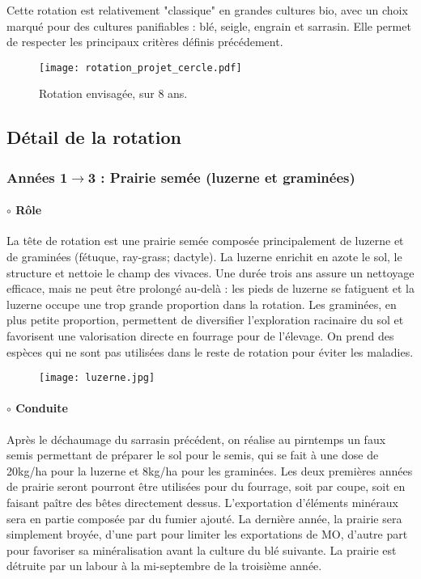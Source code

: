 \documentclass{book}
\begin{document}
Cette rotation est relativement "classique" en grandes cultures bio, avec un choix marqué pour des cultures panifiables : blé, seigle, engrain et sarrasin. Elle permet de respecter les principaux critères définis précédement. 

\begin{figure}[h!]
\begin{center}
	\texttt{[image: rotation\_projet\_cercle.pdf]}
	\caption{Rotation envisagée, sur 8 ans.}
	\label{fig:rot_cercle}
\end{center}
\end{figure}

\subsection{Détail de la rotation}
\label{part:rot_detail}

\subsubsection{Années 1$\rightarrow$3 : Prairie semée (luzerne et graminées)}

\paragraph{$\circ$ Rôle} La tête de rotation est une prairie semée composée principalement de luzerne et de graminées (fétuque, ray-grass; dactyle). La luzerne enrichit en azote le sol, le structure et nettoie le champ des vivaces. Une durée trois ans assure un nettoyage efficace, mais ne peut être prolongé au-delà : les pieds de luzerne se fatiguent et la luzerne occupe une trop grande proportion dans la rotation. Les graminées, en plus petite proportion, permettent de diversifier l'exploration racinaire du sol et favorisent une valorisation directe en fourrage pour de l'élevage. On prend des espèces qui ne sont pas utilisées dans le reste de rotation pour éviter les maladies.

\begin{figure}[h!]
\begin{center}
	\texttt{[image: luzerne.jpg]}
\end{center}
\end{figure}

\paragraph{$\circ$ Conduite} Après le déchaumage du sarrasin précédent, on réalise au pirntemps un faux semis permettant de préparer le sol pour le semis, qui se fait à une dose de 20kg/ha pour la luzerne et 8kg/ha pour les graminées. Les deux premières années de prairie seront pourront être utilisées pour du fourrage, soit par coupe, soit en faisant paître des bêtes directement dessus. L'exportation d'éléments minéraux sera en partie composée par du fumier ajouté. La dernière année, la prairie sera simplement broyée, d'une part pour limiter les exportations de MO, d'autre part pour favoriser sa minéralisation avant la culture du blé suivante. La prairie est détruite par un labour à la mi-septembre de la troisième année.
\end{document}
